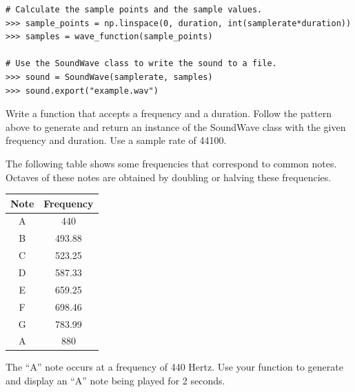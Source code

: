 \begin{lstlisting}
# Calculate the sample points and the sample values.
>>> sample_points = np.linspace(0, duration, int(samplerate*duration))
>>> samples = wave_function(sample_points)

# Use the SoundWave class to write the sound to a file.
>>> sound = SoundWave(samplerate, samples)
>>> sound.export("example.wav")
\end{lstlisting}

\begin{problem}
Write a function that accepts a frequency and a duration.
Follow the pattern above to generate and return an instance of the SoundWave class with the given frequency and duration.
Use a sample rate of 44100.

The following table shows some frequencies that correspond to common notes.
Octaves of these notes are obtained by doubling or halving these frequencies.

\begin{center}
\begin{tabular}{|c|c|}
\hline
Note & Frequency \\
\hline
A & 440 \\
B & 493.88 \\
C & 523.25 \\
D & 587.33 \\
E & 659.25 \\
F & 698.46 \\
G & 783.99 \\
A & 880 \\
\hline
\end{tabular}
\end{center}

The ``A'' note occurs at a frequency of 440 Hertz.
Use your function to generate and display an ``A'' note being played for 2 seconds.
\label{prob:generate_note}
\end{problem}

